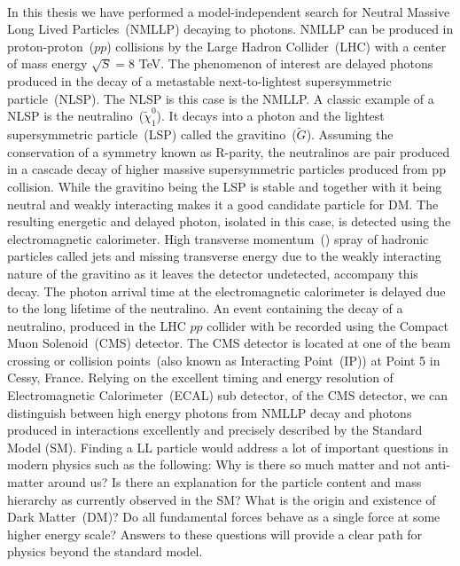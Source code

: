 \paragraph*{}
In this thesis we have performed a model-independent search for  Neutral Massive Long Lived Particles~(NMLLP) 
decaying to photons. NMLLP can be produced in proton-proton~(\textbf{$pp$}) collisions by  the Large Hadron Collider~(LHC) 
with a center of mass energy  $\sqrt{S} = 8 $ TeV. 
The phenomenon of interest are delayed photons produced in the decay of a metastable next-to-lightest supersymmetric particle~(NLSP). The NLSP is this case is the NMLLP. A classic example of a NLSP is the neutralino~($\tilde{\chi}^{0}_{1} $). It decays into a photon and the lightest supersymmetric particle~(LSP) called the gravitino~($\tilde{G}$). Assuming the conservation of a symmetry known as R-parity, the neutralinos are pair produced in a cascade decay of higher massive  supersymmetric particles produced from pp collision. While the gravitino being the LSP is stable and together with it being neutral and weakly interacting makes it a good candidate particle for DM. The resulting energetic and delayed photon, isolated in this case, is detected using the electromagnetic calorimeter. High transverse momentum~(\pt) spray of hadronic particles called jets and missing transverse energy due to the weakly interacting nature of the gravitino as it leaves the detector undetected, accompany this decay. The photon arrival time at the electromagnetic calorimeter is delayed due to the long lifetime of the neutralino. 
An event containing the decay of a neutralino, produced in the LHC $pp$ collider with be recorded using the Compact Muon Solenoid~(CMS) detector.
The CMS detector is located at one of the beam crossing or collision points~(also known as Interacting Point~(IP)) at Point 5 in Cessy, France.
Relying on the excellent timing and energy resolution of Electromagnetic Calorimeter~(ECAL) sub detector, of the CMS detector, we can distinguish between high energy photons from NMLLP decay and photons
produced in interactions excellently and precisely described by the Standard Model (SM). 
Finding a LL particle would address a lot of important questions in modern physics such as the following:
Why is there so much matter and not anti-matter around us?
Is there an explanation for the particle content and mass hierarchy as currently observed in the SM? 
What is the origin and existence of Dark Matter~(DM)?  
Do all fundamental forces behave as a single force at some higher energy scale?
Answers to these questions will provide a clear path for physics beyond the standard model.
